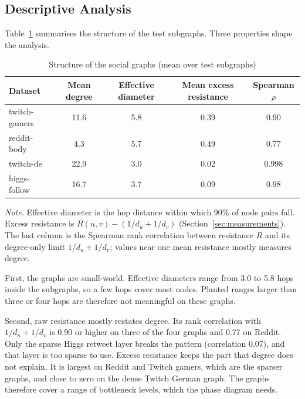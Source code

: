 \subsection{Descriptive Analysis}
Table~\ref{tab:structure} summarises the structure of the test subgraphs. Three properties shape the analysis.

\begin{table}[htbp]
\caption{Structure of the social graphs (mean over test subgraphs)}
\label{tab:structure}
\centering\small
\begin{tabular}{@{}lcccc@{}}
\toprule
Dataset & Mean degree & Effective diameter & Mean excess resistance & Spearman $\rho$ \\
\midrule
twitch-gamers & 11.6 & 5.8 & 0.39 & 0.90 \\
reddit-body   & 4.3  & 5.7 & 0.49 & 0.77 \\
twitch-de     & 22.9 & 3.0 & 0.02 & 0.998 \\
higgs-follow  & 16.7 & 3.7 & 0.09 & 0.98 \\
\bottomrule
\end{tabular}
\par\smallskip
\begin{minipage}{0.95\textwidth}\small
\textit{Note.} Effective diameter is the hop distance within which 90\% of node pairs fall. Excess resistance is $R(u,v)-(1/d_u+1/d_v)$ (Section~\ref{sec:measurements}). The last column is the Spearman rank correlation between resistance $R$ and its degree-only limit $1/d_u+1/d_v$; values near one mean resistance mostly measures degree.
\end{minipage}
\end{table}

First, the graphs are small-world. Effective diameters range from 3.0 to 5.8 hops inside the subgraphs, so a few hops cover most nodes. Planted ranges larger than three or four hops are therefore not meaningful on these graphs.

Second, raw resistance mostly restates degree. Its rank correlation with $1/d_u+1/d_v$ is 0.90 or higher on three of the four graphs and 0.77 on Reddit. Only the sparse Higgs retweet layer breaks the pattern (correlation 0.07), and that layer is too sparse to use. Excess resistance keeps the part that degree does not explain. It is largest on Reddit and Twitch gamers, which are the sparser graphs, and close to zero on the dense Twitch German graph. The graphs therefore cover a range of bottleneck levels, which the phase diagram needs.

